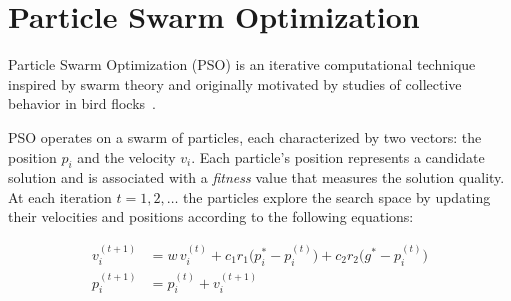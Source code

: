 %
%
%

\section{Particle Swarm Optimization}
\label{sec:background_pso}
Particle Swarm Optimization (PSO) is an iterative computational technique inspired by swarm theory and originally motivated by studies of collective behavior in bird flocks~\cite{sun2022particle,liu2006solving}.

PSO operates on a swarm of particles, each characterized by two vectors: the position $p_i$ and the velocity $v_i$. Each particle's position represents a candidate solution and is associated with a \textit{fitness} value that measures the solution quality.
At each iteration $t=1,2,\dots$ the particles explore the search space by updating their velocities and positions according to the following equations:

\begin{align*}
	v_i^{(t+1)} &= w \, v_i^{(t)}
	+ c_1 r_1 \big( p^*_{i} - p_i^{(t)} \big) 
	+ c_2 r_2 \big( g^* - p_i^{(t)} \big) \\
	p_i^{(t+1)} &= p_i^{(t)} + v_i^{(t+1)}
\end{align*}

